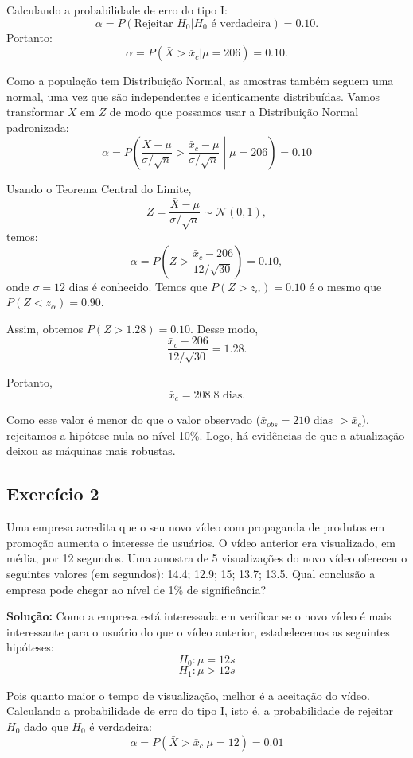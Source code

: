 \documentclass{article}
\begin{document}
Calculando a probabilidade de erro do tipo I:
    $$
    \alpha = P(\text{Rejeitar } H_0 | H_0 \text{ é verdadeira}) = 0.10.
    $$
Portanto:
    $$
    \alpha = P(\bar{X} > \bar{x}_c | \mu = 206) = 0.10.
    $$

Como a população tem Distribuição Normal, as amostras também seguem uma normal, uma vez que são independentes e identicamente distribuídas. Vamos transformar $\bar{X}$ em $Z$ de modo que possamos usar a Distribuição Normal padronizada:
    $$
    \alpha = P\left(\frac{\bar{X} - \mu}{\sigma/\sqrt{n}} > \frac{\bar{x}_c - \mu}{\sigma/\sqrt{n}} \middle| \mu = 206 \right) = 0.10
    $$

Usando o Teorema Central do Limite,
    $$
    Z = \frac{\bar{X} - \mu}{\sigma/\sqrt{n}} \sim \mathcal{N}(0,1),
    $$
temos:
    $$
    \alpha = P\left(Z > \frac{\bar{x}_c - 206}{12/\sqrt{30}}\right) = 0.10,
    $$
onde $\sigma = 12$ dias é conhecido. Temos que $P(Z > z_\alpha) = 0.10$ é o mesmo que $P(Z < z_\alpha) = 0.90$.

Assim, obtemos $P(Z > 1.28) = 0.10$. Desse modo,
    $$
    \frac{\bar{x}_c - 206}{12/\sqrt{30}} = 1.28.
    $$

Portanto,
    $$
    \bar{x}_c = 208.8 \text{ dias}.
    $$

Como esse valor é menor do que o valor observado ($\bar{x}_{obs} = 210$ dias $> \bar{x}_c$), rejeitamos a hipótese nula ao nível 10\%. Logo, há evidências de que a atualização deixou as máquinas mais robustas.

\subsection{Exercício 2}
Uma empresa acredita que o seu novo vídeo com propaganda de produtos em promoção aumenta o interesse de usuários. O vídeo anterior era visualizado, em média, por 12 segundos. Uma amostra de 5 visualizações do novo vídeo ofereceu o seguintes valores (em segundos): 14.4; 12.9; 15; 13.7; 13.5. Qual conclusão a empresa pode chegar ao nível de 1\% de significância?

\vspace{0.5cm}
\textbf{Solução:}
Como a empresa está interessada em verificar se o novo vídeo é mais interessante para o usuário do que o vídeo anterior, estabelecemos as seguintes hipóteses:
    $$
    H_0 : \mu = 12s
    $$
    $$
    H_1 : \mu > 12s
    $$

Pois quanto maior o tempo de visualização, melhor é a aceitação do vídeo. Calculando a probabilidade de erro do tipo I, isto é, a probabilidade de rejeitar $H_0$ dado que $H_0$ é verdadeira:
    $$
    \alpha = P(\bar{X} > \bar{x}_c | \mu = 12) = 0.01
    $$
\end{document}
